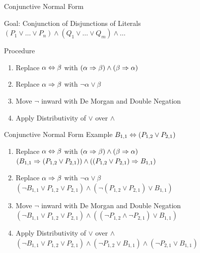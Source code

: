 \documentclass[14pt]{beamer}
\begin{document}
\begin{frame}{Conjunctive Normal Form}
	\begin{block}{Goal: Conjunction of Disjunctions of Literals}
		$(P_1 \lor \ldots \lor P_n) \land (Q_1 \lor \ldots \lor Q_m) \land \ldots$
	\end{block}
	\begin{block}{Procedure}
		\begin{enumerate}
			\item Replace $\alpha \Leftrightarrow \beta$ with $(\alpha\Rightarrow \beta)\land (\beta\Rightarrow \alpha)$
			\item Replace $\alpha \Rightarrow \beta$ with $\lnot\alpha \lor \beta$
			\item Move $\lnot$ inward with De Morgan and Double Negation
			\item Apply Distributivity of $\lor$ over $\land$
		\end{enumerate}
	\end{block}
\end{frame}
\begin{frame}{Conjunctive Normal Form Example}
	\hspace{2em} $B_{1,1} \Leftrightarrow (P_{1,2} \lor P_{2,1})$
	\begin{enumerate}
		\pause\vspace{.5em}\item
			Replace $\alpha \Leftrightarrow \beta$ with $(\alpha \Rightarrow \beta)\land (\beta\Rightarrow \alpha)$ \\
			\pause
			$(B_{1,1} \Rightarrow (P_{1,2} \lor P_{2,1})) \land ((P_{1,2} \lor P_{2,1}) \Rightarrow B_{1,1})$
		
		\pause\vspace{.5em}\item
			Replace $\alpha \Rightarrow \beta$ with $\lnot\alpha \lor \beta$ \\
			\pause
			$(\lnot B_{1,1} \lor P_{1,2} \lor P_{2,1}) \land (\lnot(P_{1,2} \lor P_{2,1}) \lor B_{1,1})$
		
		\pause\vspace{.5em}\item
			Move $\lnot$ inward with De Morgan and Double Negation \\
			\pause
			$(\lnot B_{1,1} \lor P_{1,2} \lor P_{2,1}) \land ((\lnot P_{1,2} \land \lnot P_{2,1}) \lor B_{1,1})$
		
		\pause\vspace{.5em}\item
			Apply Distributivity of $\lor$ over $\land$ \\
			\pause
			$(\lnot B_{1,1} \lor P_{1,2} \lor P_{2,1}) \land (\lnot P_{1,2} \lor B_{1,1}) \land (\lnot P_{2,1} \lor B_{1,1})$
	\end{enumerate}
\end{frame}
\end{document}
